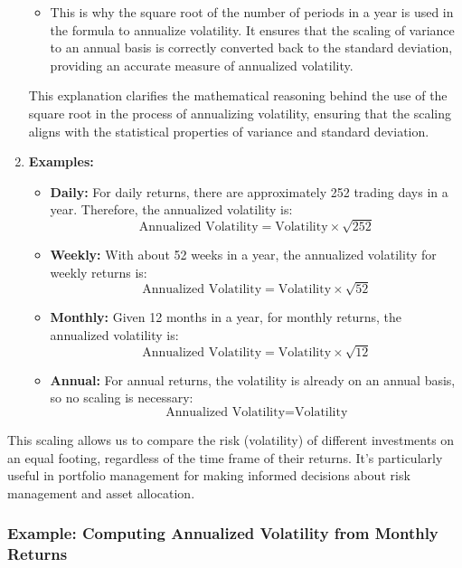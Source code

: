 \documentclass{article}
\begin{document}
\begin{enumerate}
\begin{itemize}
        \item This is why the square root of the number of periods in a year is used in the formula to annualize volatility. It ensures that the scaling of variance to an annual basis is correctly converted back to the standard deviation, providing an accurate measure of annualized volatility.
    \end{itemize}

    This explanation clarifies the mathematical reasoning behind the use of the square root in the process of annualizing volatility, ensuring that the scaling aligns with the statistical properties of variance and standard deviation.


    
    \item \textbf{Examples:}
    \begin{itemize}
        \item \textbf{Daily:} For daily returns, there are approximately 252 trading days in a year. Therefore, the annualized volatility is:
        \[ \text{Annualized Volatility} = \text{Volatility} \times \sqrt{252} \]
        
        \item \textbf{Weekly:} With about 52 weeks in a year, the annualized volatility for weekly returns is:
        \[ \text{Annualized Volatility} = \text{Volatility} \times \sqrt{52} \]
        
        \item \textbf{Monthly:} Given 12 months in a year, for monthly returns, the annualized volatility is:
        \[ \text{Annualized Volatility} = \text{Volatility} \times \sqrt{12} \]
        
        \item \textbf{Annual:} For annual returns, the volatility is already on an annual basis, so no scaling is necessary:
        \[ \text{Annualized Volatility} = \text{Volatility} \]
    \end{itemize}
\end{enumerate}

This scaling allows us to compare the risk (volatility) of different investments on an equal footing, regardless of the time frame of their returns. It's particularly useful in portfolio management for making informed decisions about risk management and asset allocation.

\subsubsection{Example: Computing Annualized Volatility from Monthly Returns}
\end{document}
